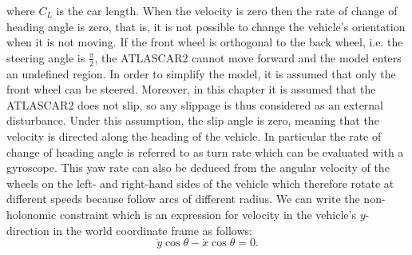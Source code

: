 where $C_L$ is the car length. When the velocity is zero then the rate of change of heading angle is zero, that is, it is not possible to change the vehicle's orientation
when it is not moving. If the front wheel is orthogonal to the back wheel, i.e. the steering angle is $\frac{\pi}{2}$, the ATLASCAR2 cannot move forward and the model enters an undefined region. In order to simplify the model, it is assumed that only the front wheel can be steered. Moreover, in this chapter it is assumed that the ATLASCAR2 does not slip, so any slippage is thus considered as an external disturbance. Under this assumption, the slip angle is zero, meaning that the velocity is directed along the heading of the vehicle. In particular the rate of change of heading angle is referred to as turn rate which can be evaluated with a gyroscope. This yaw rate can also be deduced from the angular velocity of the wheels on the left- and right-hand sides of the vehicle which therefore rotate at different speeds because follow arcs of different radius. We can write the non-holonomic constraint which is an expression for velocity in the vehicle's $y$-direction in the world coordinate frame as follows:
\begin{equation}
	\dot{y}\cos\theta-\dot{x}\cos\theta=0.
\end{equation}

